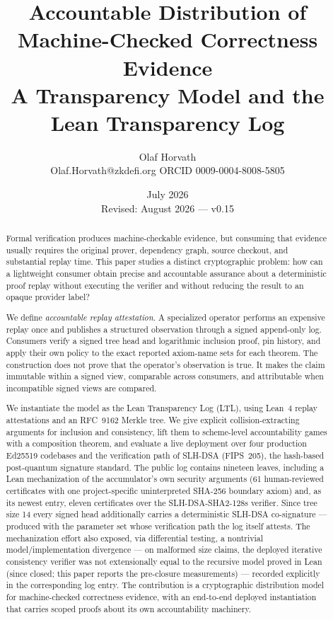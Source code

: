 \documentclass[11pt]{article}
\title{\textbf{Accountable Distribution of Machine-Checked Correctness Evidence}\\[3pt]
\large A Transparency Model and the Lean Transparency Log}
\author{Olaf Horvath\\
\small Olaf.Horvath@zkdefi.org \quad ORCID 0009-0004-8008-5805}
\date{July 2026 \\ {\normalsize Revised: August 2026 --- v0.15}}
\theoremstyle{remark}
\begin{document}
\maketitle

\begin{abstract}
Formal verification produces machine-checkable evidence, but consuming that
evidence usually requires the original prover, dependency graph, source
checkout, and substantial replay time. This paper studies a distinct
cryptographic problem: how can a lightweight consumer obtain precise and
accountable assurance about a deterministic proof replay without executing the
verifier and without reducing the result to an opaque provider label?

We define \emph{accountable replay attestation}. A specialized operator performs
an expensive replay once and publishes a structured observation through a
signed append-only log. Consumers verify a signed tree head and logarithmic
inclusion proof, pin history, and apply their own policy to the exact reported axiom-name sets
for each theorem. The construction does not prove that the operator's
observation is true. It makes the claim immutable within a signed view,
comparable across consumers, and attributable when incompatible signed views
are compared.

We instantiate the model as the Lean Transparency Log (LTL), using Lean~4 replay
attestations and an RFC~9162 Merkle tree. We give explicit
collision-extracting arguments for inclusion and consistency, lift them to
scheme-level accountability games with a composition theorem, and evaluate a
live deployment over four production Ed25519 codebases and the verification
path of SLH-DSA (FIPS~205), the hash-based post-quantum signature standard.
The public log contains nineteen leaves, including a Lean mechanization of the
accumulator's own security arguments (61 human-reviewed certificates with one
project-specific uninterpreted SHA-256 boundary axiom) and, as its newest
entry, eleven certificates over the SLH-DSA-SHA2-128s verifier. Since tree
size 14 every signed head additionally carries a deterministic SLH-DSA
co-signature --- produced with the parameter set whose verification path the
log itself attests. The mechanization effort also exposed, via
differential testing, a nontrivial model/implementation divergence --- on
malformed size claims, the deployed iterative consistency verifier was not
extensionally equal to the recursive model proved in Lean (since closed;
this paper reports the pre-closure measurements) --- recorded explicitly
in the corresponding log entry. The contribution is a cryptographic distribution
model for machine-checked correctness evidence, with an end-to-end deployed
instantiation that carries scoped proofs about its own accountability
machinery.
\end{abstract}
\end{document}
